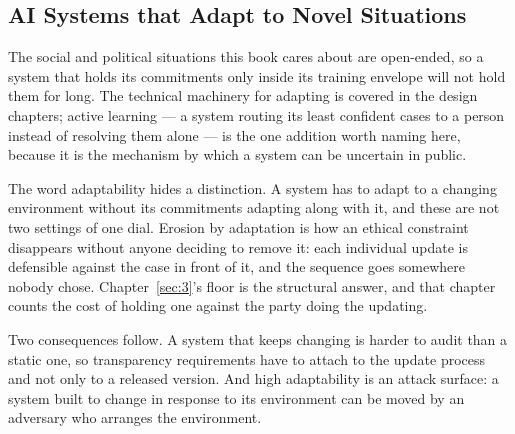 \subsection{AI Systems that Adapt to Novel Situations}
\label{sec:6.2.1}
The social and political situations this book cares about are open-ended, so a system that holds its commitments only inside its training envelope will not hold them for long. The technical machinery for adapting is covered in the design chapters; active learning — a system routing its least confident cases to a person instead of resolving them alone — is the one addition worth naming here, because it is the mechanism by which a system can be uncertain in public.

The word adaptability hides a distinction. A system has to adapt to a changing environment without its commitments adapting along with it, and these are not two settings of one dial. Erosion by adaptation is how an ethical constraint disappears without anyone deciding to remove it: each individual update is defensible against the case in front of it, and the sequence goes somewhere nobody chose. Chapter~\ref{sec:3}'s floor is the structural answer, and that chapter counts the cost of holding one against the party doing the updating.

Two consequences follow. A system that keeps changing is harder to audit than a static one, so transparency requirements have to attach to the update process and not only to a released version. And high adaptability is an attack surface: a system built to change in response to its environment can be moved by an adversary who arranges the environment.
